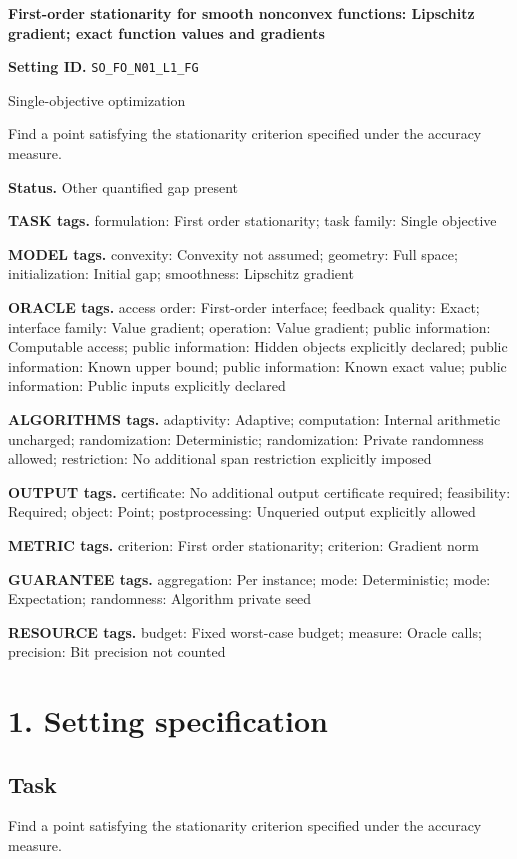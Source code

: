 \documentclass[10pt,a4paper]{article}
\begin{document}
\raggedright

{\LARGE\bfseries\sffamily\color{AtlasNavy} First-order stationarity for smooth nonconvex functions: Lipschitz gradient; exact function values and gradients\par}\vspace{5pt}
\textbf{Setting ID.} \texttt{SO\_\allowbreak{}FO\_\allowbreak{}N01\_\allowbreak{}L1\_\allowbreak{}FG}

Single-objective optimization

Find a point satisfying the stationarity criterion specified under the accuracy measure.

\textbf{Status.} Other quantified gap present

\textbf{TASK tags.} formulation: First order stationarity; task family: Single objective

\textbf{MODEL tags.} convexity: Convexity not assumed; geometry: Full space; initialization: Initial gap; smoothness: Lipschitz gradient

\textbf{ORACLE tags.} access order: First-order interface; feedback quality: Exact; interface family: Value gradient; operation: Value gradient; public information: Computable access; public information: Hidden objects explicitly declared; public information: Known upper bound; public information: Known exact value; public information: Public inputs explicitly declared

\textbf{ALGORITHMS tags.} adaptivity: Adaptive; computation: Internal arithmetic uncharged; randomization: Deterministic; randomization: Private randomness allowed; restriction: No additional span restriction explicitly imposed

\textbf{OUTPUT tags.} certificate: No additional output certificate required; feasibility: Required; object: Point; postprocessing: Unqueried output explicitly allowed

\textbf{METRIC tags.} criterion: First order stationarity; criterion: Gradient norm

\textbf{GUARANTEE tags.} aggregation: Per instance; mode: Deterministic; mode: Expectation; randomness: Algorithm private seed

\textbf{RESOURCE tags.} budget: Fixed worst-case budget; measure: Oracle calls; precision: Bit precision not counted

\section{1. Setting specification}
\subsection{Task}
Find a point satisfying the stationarity criterion specified under the accuracy measure.
\end{document}
